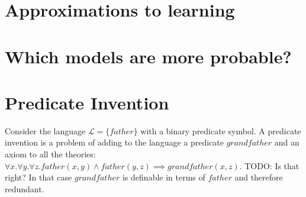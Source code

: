 \section{Approximations to learning}
\section{Which models are more probable?}
\section{Predicate Invention}
Consider the language $\mathcal{L}=\{father\}$ with a binary predicate symbol. A predicate invention is a problem of adding to the language a predicate $grandfather$ and an axiom to all the theories: $\forall x. \forall y. \forall z. father(x,y) \wedge father(y,z) \implies grandfather(x,z)$.
TODO: Is that right? In that case $grandfather$ is definable in terms of $father$ and therefore redundant.